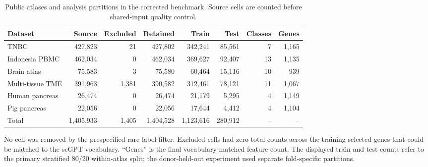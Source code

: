 \begin{table}[p]
\centering
\caption{Public atlases and analysis partitions in the corrected benchmark. Source cells are counted before shared-input quality control.}
\label{tab:datasets}
\footnotesize
\setlength{\tabcolsep}{3.5pt}
\begin{threeparttable}
\begin{tabular}{lrrrrrrr}
\toprule
Dataset & Source & Excluded & Retained & Train & Test & Classes & Genes \\
\midrule
TNBC & 427,823 & 21 & 427,802 & 342,241 & 85,561 & 7 & 1,165 \\
Indonesia PBMC & 462,034 & 0 & 462,034 & 369,627 & 92,407 & 13 & 1,135 \\
Brain atlas & 75,583 & 3 & 75,580 & 60,464 & 15,116 & 10 & 939 \\
Multi-tissue TME & 391,963 & 1,381 & 390,582 & 312,461 & 78,121 & 11 & 1,067 \\
Human pancreas & 26,474 & 0 & 26,474 & 21,179 & 5,295 & 4 & 1,149 \\
Pig pancreas & 22,056 & 0 & 22,056 & 17,644 & 4,412 & 4 & 1,104 \\
\midrule
Total & 1,405,933 & 1,405 & 1,404,528 & 1,123,616 & 280,912 & -- & -- \\
\bottomrule
\end{tabular}
\begin{tablenotes}[flushleft]\scriptsize
\item No cell was removed by the prespecified rare-label filter. Excluded cells had zero total counts across the training-selected genes that could be matched to the scGPT vocabulary. ``Genes'' is the final vocabulary-matched feature count. The displayed train and test counts refer to the primary stratified 80/20 within-atlas split; the donor-held-out experiment used separate fold-specific partitions.
\end{tablenotes}
\end{threeparttable}
\end{table}
